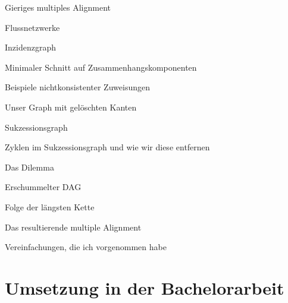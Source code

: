 \documentclass[wide,xcolor={x11names},hyperref={colorlinks=false},pantone312]{beamer}
\begin{document}
\begin{frame}[t]{Gieriges multiples Alignment}
\end{frame}

\begin{frame}[t]{Flussnetzwerke}
\end{frame}

\begin{frame}[t]{Inzidenzgraph}
\end{frame}

\begin{frame}[t]{Minimaler Schnitt auf Zusammenhangskomponenten}
\end{frame}

\begin{frame}[t]{Beispiele nichtkonsistenter Zuweisungen}
\end{frame}

\begin{frame}[t]{Unser Graph mit gelöschten Kanten}
\end{frame}

\begin{frame}[t]{Sukzessionsgraph}
\end{frame}

\begin{frame}[t]{Zyklen im Sukzessionsgraph und wie wir diese entfernen}
\end{frame}

\begin{frame}[t]{Das Dilemma}
\end{frame}

\begin{frame}[t]{Erschummelter DAG}
\end{frame}

\begin{frame}[t]{Folge der längsten Kette}
\end{frame}

\begin{frame}[t]{Das resultierende multiple Alignment}
\end{frame}

\begin{frame}[t]{Vereinfachungen, die ich vorgenommen habe}
\end{frame}

\section{Umsetzung in der Bachelorarbeit}
\end{document}
